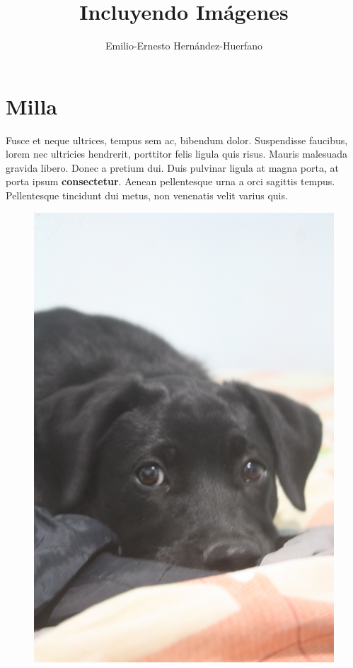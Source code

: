 \documentclass[12pt,letterpaper,oneside]{book}
\title{Incluyendo Imágenes}
\author{Emilio-Ernesto Hernández-Huerfano}
\begin{document}
\maketitle
\tableofcontents
\listoffigures


\chapter{Milla}
\noindent Fusce et neque ultrices, tempus sem ac, bibendum dolor. Suspendisse faucibus, lorem nec ultricies hendrerit, porttitor felis ligula quis risus. Mauris malesuada gravida libero. Donec a pretium dui. Duis pulvinar ligula at magna porta, at porta ipsum \textbf{consectetur}. Aenean pellentesque urna a orci sagittis tempus. Pellentesque tincidunt dui metus, non venenatis velit varius quis.

\begin{figure}[h]
\includegraphics[scale=.06]{img/milla.jpg}
\end{figure}
\end{document}
